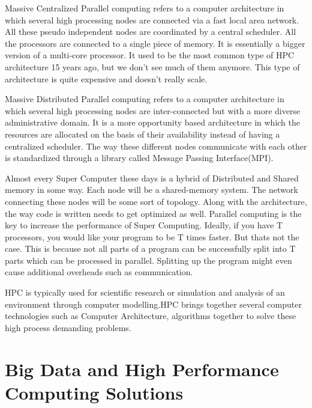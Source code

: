 \documentclass[sigconf]{acmart}
\begin{document}
Massive Centralized Parallel computing refers to a computer architecture in which several high processing nodes are connected via a fast local area network. All these pseudo independent nodes are coordinated by a central scheduler. All the processors are connected to a single piece of memory. It is essentially a bigger version of a multi-core processor. It used to be the most common type of HPC architecture 15 years ago, but we don't see much of them anymore. This type of architecture is quite expensive and doesn't really scale. \cite{hpcwiki}

Massive Distributed Parallel computing refers to a computer architecture in which several high processing nodes are inter-connected but with a more diverse administrative domain. It is a more opportunity based architecture in which the resources are allocated on the basis of their availability instead of having a centralized scheduler. The way these different nodes communicate with each other is standardized through a library called Message Passing Interface(MPI).\cite{hpcwiki}

Almost every Super Computer these days is a hybrid of Distributed and Shared memory in some way. Each node will be a shared-memory system. The network connecting these nodes will be some sort of topology. Along with the architecture, the way code is written needs to get optimized as well. Parallel computing is the key to increase the performance of Super Computing. Ideally, if you have T processors, you would like your program to be T times faster. But thats not the case. This is because not all parts of a program can be successfully split into T parts which can be processed in parallel. Splitting up the program might even cause additional overheads such as communication. 

HPC is typically used for scientific research or simulation and analysis of an environment through computer modelling.HPC brings together several computer technologies such as Computer Architecture, algorithms together to solve these high process demanding problems. 

\section{Big Data and High Performance Computing Solutions}
\end{document}
